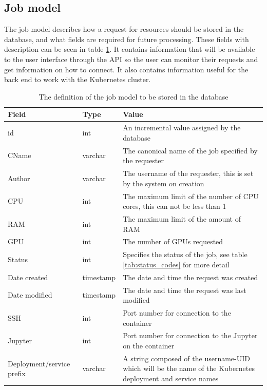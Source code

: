 \documentclass[../main.tex]{subfiles}
\begin{document}
\pagebreak\subsection*{Job model}
The job model describes how a request for resources should be stored in the database, and what fields are required for future processing. These fields with description can be seen in table \ref{tab:job_model}. It contains information that will be available to the user interface through the API so the user can monitor their requests and get information on how to connect. It also contains information useful for the back end to work with the Kubernetes cluster.
\begin{table}[H]
    \begin{tabular}{|l|l|p{.6\linewidth}|}
        \hline
        \textbf{Field} & \textbf{Type} & \textbf{Value} \\\hline
        id & int & An incremental value assigned by the database \\\hline
        CName & varchar & The canonical name of the job specified by the requester \\\hline
        Author & varchar &  The username of the requester, this is set by the system on creation \\\hline
        CPU & int & The maximum limit of the number of CPU cores, this can not be less than 1 \\\hline
        RAM & int & The maximum limit of the amount of RAM\\\hline
        GPU & int &The number of GPUs requested\\\hline
        Status & int & Specifies the status of the job, see table \ref{tab:status_codes} for more detail\\\hline
        Date created & timestamp & The date and time the request was created \\\hline
        Date modified & timestamp & The date and time the request was last modified \\\hline
        SSH & int & Port number for connection to the container \\\hline
        Jupyter & int & Port number for connection to the Jupyter on the container \\\hline
        Deployment/service prefix & varchar & A string composed of the username-UID which will be the name of the Kubernetes deployment and service names \\\hline
    \end{tabular}
    \caption{The definition of the job model to be stored in the database}
    \label{tab:job_model}
\end{table}
\end{document}
